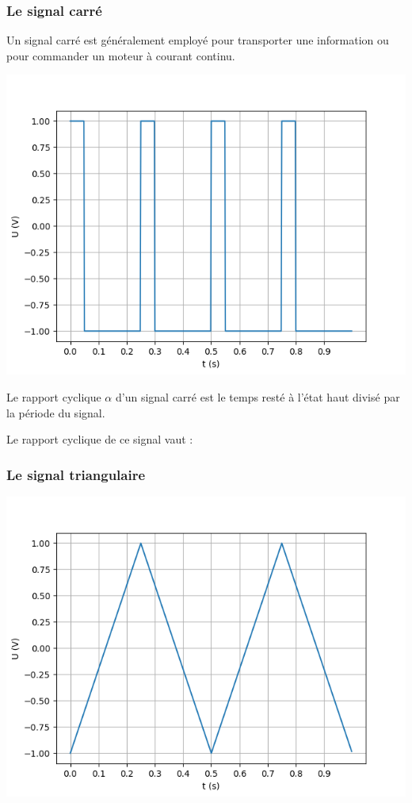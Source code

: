 \documentclass[10pt,fleqn]{article} %
\begin{document}
    \subsubsection{Le signal carré}
    Un signal carré est généralement employé pour transporter une information ou pour commander un moteur à courant continu.
    \begin{center}
        \includegraphics[height=0.3\textheight]{images/carre.png}
    \end{center}

    \begin{defi}
        Le rapport cyclique $\alpha$ d'un signal carré est le temps resté à l'état haut divisé par la période du signal.
    \end{defi}

    \begin{exemple}
        Le rapport cyclique de ce signal vaut : 
    \end{exemple}


    \subsubsection{Le signal triangulaire}
    \begin{center}
        \includegraphics[height=0.3\textheight]{images/triangle.png}
    \end{center}
\end{document}
